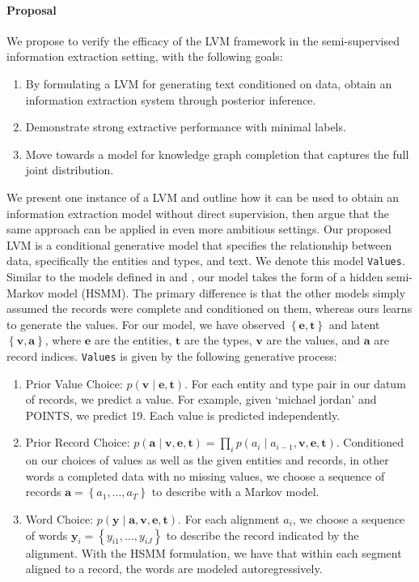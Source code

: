 \documentclass[12pt]{article}
\newcommand\set[1]{\left\{#1\right\}}
\newcommand{\ba}{\mathbf{a}}
\newcommand{\be}{\mathbf{e}}
\newcommand{\bt}{\mathbf{t}}
\newcommand{\bv}{\mathbf{v}}
\newcommand{\by}{\mathbf{y}}
\begin{document}
\paragraph{Proposal}
We propose to verify the efficacy of the LVM framework in the
semi-supervised information extraction setting,
with the following goals:
\begin{enumerate}
\item By formulating a LVM for generating text conditioned on data,
    obtain an information extraction system through posterior inference.
\item Demonstrate strong extractive performance with minimal labels.
\item Move towards a model for knowledge graph completion that captures
    the full joint distribution.
\end{enumerate}
We present one instance of a LVM and outline how it can be used to obtain
an information extraction model without direct supervision,
then argue that the same approach can be applied in even more ambitious settings.
Our proposed LVM is a conditional generative model that specifies
the relationship between data, specifically the entities and types, and text.
We denote this model \texttt{Values}.
Similar to the models defined in \citet{wiseman2018template} and \citet{liang2009semalign},
our model takes the form of a hidden semi-Markov model (HSMM).
The primary difference is that the other models simply assumed the records
were complete and conditioned on them, whereas ours learns to generate the values.
For our model, we have observed $\set{\be,\bt}$ and latent $\set{\bv,\ba}$, 
where $\be$ are the entities, $\bt$ are the types, $\bv$ are the values, and $\ba$ are
record indices.
\texttt{Values} is given by the following generative process:
\begin{enumerate}
\item Prior Value Choice: $p(\bv\mid\be,\bt)$.
For each entity and type pair in our datum of records, we predict a value.
For example, given `michael jordan' and POINTS, we predict 19.
Each value is predicted independently.
\item Prior Record Choice: $p(\ba\mid\bv,\be,\bt) = \prod_i p(a_i\mid a_{i-1},\bv,\be,\bt)$.
Conditioned on our choices of values as well as the given entities and records,
in other words a completed data with no missing values,
we choose a sequence of records $\ba = \set{a_1,\ldots,a_T}$ to describe with a Markov model.
\item Word Choice: $p(\by\mid\ba,\bv,\be,\bt)$.
For each alignment $a_i$,
we choose a sequence of words $\by_i = \set{y_{i1},\ldots,y_{iJ}}$ to describe the record
indicated by the alignment.
With the HSMM formulation, we have that within each segment aligned to a record,
the words are modeled autoregressively.
\end{enumerate}
\end{document}
